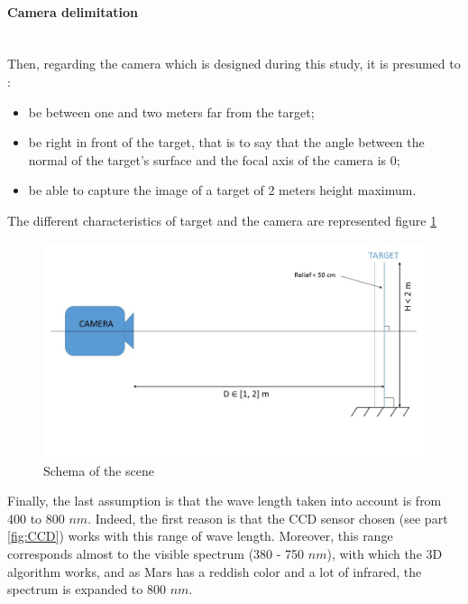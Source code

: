\paragraph*{Camera delimitation}
~\\
Then, regarding the camera which is designed during this study, it is presumed to :
\begin{itemize}
\item be between one and two meters far from the target;
\item be right in front of the target, that is to say that the angle between the normal of the target's surface and the focal axis of the camera is 0\textdegree;
\item be able to capture the image of a target of 2 meters height maximum.
\end{itemize}

The different characteristics of target and the camera are represented figure \ref{fig:schema system}


\begin{figure}[h]
  \centerline{\includegraphics[scale=0.4]{fig/schemaSystem.jpg}}
  \caption{Schema of the scene}
  \label{fig:schema system}
\end{figure}

Finally, the last assumption is that the wave length taken into account is from 400 to 800 $nm$. Indeed, the first reason is that the CCD sensor chosen (see part \ref{fig:CCD}) works with this range of wave length. Moreover, this range corresponds almost to the visible spectrum (380 - 750 $nm$), with which the 3D algorithm works, and as Mars has a reddish color and a lot of infrared, the spectrum is expanded to 800 $nm$.

